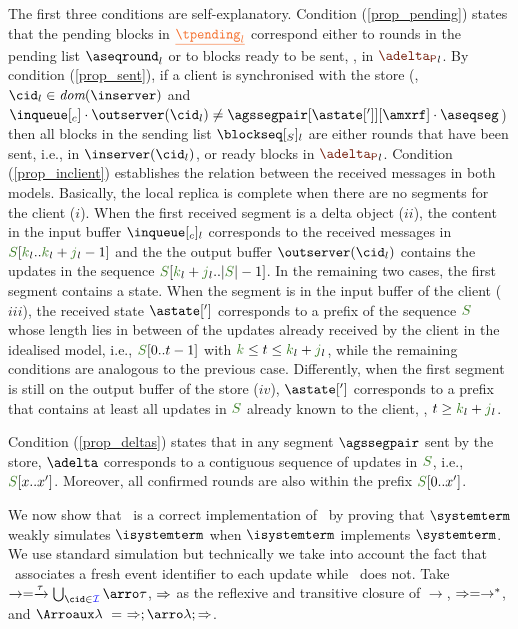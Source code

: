The  first three conditions are self-explanatory. Condition (\ref{prop_pending})  states that the pending blocks in $\flatten{\tpending_l}$  
correspond either to  rounds in the  pending list  $\pending_l$ or  to blocks ready to 
be sent, \ie, in ${\pushbuffer}_l$.
By condition (\ref{prop_sent}), if a client is synchronised with the store 
(\ie, $\cid_l \in \dom\inserver$ and $\inclient \cdot\outserver(\cid_l) \neq \agssegpair[{\astate[']}][{\amxrf}]\cdot\aseqseg$) 
then  all  blocks  in  the sending list $\tsent_l$  are either rounds 
that have been sent, i.e., in $\inserver(\cid_l)$, or ready blocks in ${\pushbuffer}_l$.
Condition (\ref{prop_inclient}) establishes the relation between the received messages in both models. Basically, 
the local replica 
is complete  when there are no segments for the client ($i$). %
When the first received segment is a delta object ($ii$),
 the  content in the input buffer $\inclient_l$ corresponds to the received messages in $\queuemessage[\tknown_l..\tknown_l+\treceivebuffer_l-1]$
and the the  output buffer $\outserver(\cid_l)$ contains the  updates in the 
sequence $\queuemessage[\tknown_l+\treceivebuffer_l..|\queuemessage| - 1]$. 
In the remaining two  cases, the first segment  contains a state. 
When the segment is  
in the input buffer of the client ($iii$), 
the received state $\astate[']$ corresponds to a prefix of the sequence $\queuemessage$ 
whose length lies in between of the updates already received by the client in the 
idealised model, i.e., 
$\queuemessage[0 .. t - 1]$ with  $\tknown\leq t \leq \tknown_l+\treceivebuffer_l$, while the remaining
conditions are analogous to the previous case.  Differently, when the 
first segment is still on the output buffer of the store ($iv$),  $\astate[']$  corresponds to a
 prefix that contains at least all  updates in $\queuemessage$ already known to the client, 
 \ie, $t \geq \tknown_l+\treceivebuffer_l $.    
 
 Condition (\ref{prop_deltas}) states that in  any segment $\agssegpair$  sent by the 
 store, $\adelta$ corresponds to a contiguous sequence of updates in $\queuemessage$, i.e., $\queuemessage[x..x']$. 
 Moreover, all confirmed rounds are also within the prefix $\queuemessage[0..x']$.


We  now show that \igsp\ is a correct implementation of \gsp\ by proving that 
%
%
$\systemterm$ weakly simulates $\isystemterm$ 
when
 $\isystemterm$  implements $\systemterm$.
 We use standard simulation %
 but technically we take into account the fact that
 \gsp\ associates a fresh event identifier to each update while \igsp\ does not. Take  $\rightarrow = \tr{\tau} \bigcup_{\cid\in\idset} \arroi{\tau}$,
 $\Rightarrow$ as the reflexive and transitive closure of $\rightarrow$, \ie $\Rightarrow = \rightarrow^*$, and 
 $\Arroi{\lambda} \ = \ \Arro;\arroi{\lambda};\Arro$.
 
